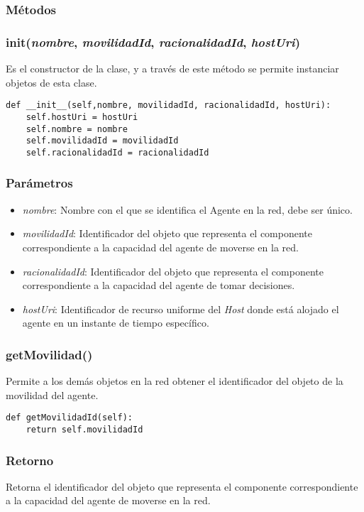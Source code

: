 \documentclass{article}
\begin{document}
\subsubsection*{\textbf{Métodos}}

\subsubsection{\textbf{init}(\textit{nombre}, \textit{movilidadId}, \textit{racionalidadId}, \textit{hostUri})}
Es el constructor de la clase, y a través de este método se permite instanciar objetos de esta clase.
\begin{lstlisting}
def __init__(self,nombre, movilidadId, racionalidadId, hostUri):
	self.hostUri = hostUri
	self.nombre = nombre
	self.movilidadId = movilidadId
	self.racionalidadId = racionalidadId
\end{lstlisting}
\subsubsection*{Parámetros}
\begin{itemize}
\item \textit{nombre}: Nombre con el que se identifica el Agente en la red, debe ser único.
\item \textit{movilidadId}: Identificador del objeto que representa el componente correspondiente a la capacidad del agente de moverse en la red.
\item \textit{racionalidadId}: Identificador del objeto que representa el componente correspondiente a la capacidad del agente de tomar decisiones.
\item \textit{hostUri}: Identificador de recurso uniforme del \textit{Host} donde está alojado el agente en un instante de tiempo específico.
\end{itemize}
\subsubsection{\textbf{getMovilidad}()}
Permite a los demás objetos en la red obtener el identificador del objeto de la movilidad del agente.
\begin{lstlisting}
def getMovilidadId(self):
	return self.movilidadId
\end{lstlisting}
\subsubsection*{Retorno}
Retorna el identificador del objeto que representa el componente correspondiente a la capacidad del agente de moverse en la red.
\end{document}
